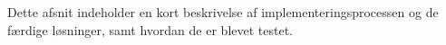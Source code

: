 
Dette afsnit indeholder en kort beskrivelse af implementeringsprocessen og de færdige løsninger, samt hvordan de er blevet testet.